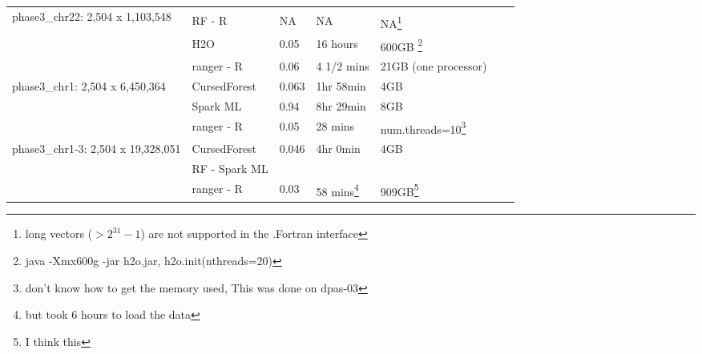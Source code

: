 \documentclass[11pt]{article}
\newcommand{\cursedforest}{{\sc CursedForest}}
\begin{document}
\begin{table}[!ht]
\begin{minipage}{\textwidth}
\begin{tabular}{|l|l|l|l|l|l|p{1cm}|}
 \hline
\multirow{3}{*}{phase3\_chr22: 2,504 x 1,103,548}   &               &            &                  &                                                                \\
                                                    & RF - R        & NA         & NA               & NA\footnote{long vectors ($> 2^31-1$)  are not supported in the .Fortran interface} \\
                                                    & H2O           & 0.05       & 16 hours         & 600GB \footnote{java -Xmx600g -jar h2o.jar,   h2o.init(nthreads=20)} \\
                                                    & ranger - R    & 0.06       & 4 1/2 mins       & 21GB (one processor) \\
\hline
\multirow{3}{*}{phase3\_chr1: 2,504 x 6,450,364}    & \cursedforest\ & 0.063  & 1hr 58min        & 4GB \\
                                                    & Spark ML  & 0.94       & 8hr 29min        & 8GB \\
                                                    & ranger - R      &  0.05       & 28 mins          & num.threads=10\footnote{don't
                                                                                                      know how to get the memory
                                                                                                      used,   This was done on dpas-03} \\
\hline
\multirow{3}{*}{phase3\_chr1-3: 2,504 x 19,328,051} & \cursedforest\ & 0.046  & 4hr 0min                                             & 4GB \\
                                                    & RF - Spark ML  &            &                                                      & \\
                                                    & ranger - R      & 0.03      & 58 mins\footnote{ but took 6 hours to load the
                                                                                   data}
                                                                                                                                         &
                                                                                                                                           909GB\footnote{I
                                                                                                                                           think
                                                                                                                                           this
}
\end{tabular}
\end{minipage}
\end{table}
\end{document}
